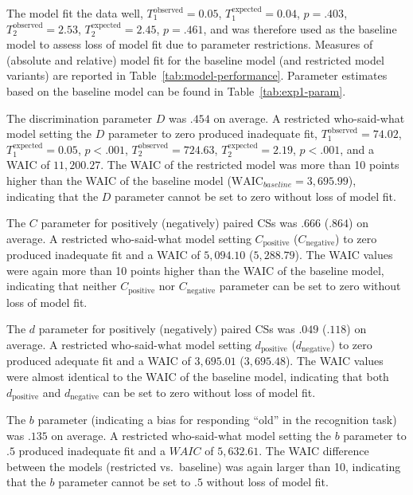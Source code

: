 \documentclass[
  man,floatsintext]{apa6}
\begin{document}
The model fit the data well, \(T_1^{\mathrm{observed}} = 0.05\), \(T_1^{\mathrm{expected}} = 0.04\), \(p = .403\), \(T_2^{\mathrm{observed}} = 2.53\), \(T_2^{\mathrm{expected}} = 2.45\), \(p = .461\), and was therefore used as the baseline model to assess loss of model fit due to parameter restrictions.
Measures of (absolute and relative) model fit for the baseline model (and restricted model variants) are reported in Table~\ref{tab:model-performance}.
Parameter estimates based on the baseline model can be found in Table~\ref{tab:exp1-param}.

The discrimination parameter \(D\) was \(.454\) on average.
A restricted who-said-what model setting the \(D\) parameter to zero produced inadequate fit, \(T_1^{\mathrm{observed}} = 74.02\), \(T_1^{\mathrm{expected}} = 0.05\), \(p < .001\), \(T_2^{\mathrm{observed}} = 724.63\), \(T_2^{\mathrm{expected}} = 2.19\), \(p < .001\), and a WAIC of \(11,200.27\).
The WAIC of the restricted model was more than 10 points higher than the WAIC of the baseline model (\(\text{WAIC}_{baseline}=3,695.99\)), indicating that the \(D\) parameter cannot be set to zero without loss of model fit.

The \(C\) parameter for positively (negatively) paired CSs was \(.666\) (\(.864\)) on average.
A restricted who-said-what model setting \(C_{\mathrm{positive}}\) (\(C_{\mathrm{negative}}\)) to zero produced inadequate fit and a WAIC of \(5,094.10\) (\(5,288.79\)).
The WAIC values were again more than 10 points higher than the WAIC of the baseline model, indicating that neither \(C_{\mathrm{positive}}\) nor \(C_{\mathrm{negative}}\) parameter can be set to zero without loss of model fit.

The \(d\) parameter for positively (negatively) paired CSs was \(.049\) (\(.118\)) on average.
A restricted who-said-what model setting \(d_{\mathrm{positive}}\) (\(d_{\mathrm{negative}}\)) to zero produced adequate fit and a WAIC of \(3,695.01\) (\(3,695.48\)).
The WAIC values were almost identical to the WAIC of the baseline model, indicating that both \(d_{\mathrm{positive}}\) and \(d_{\mathrm{negative}}\) can be set to zero without loss of model fit.

The \(b\) parameter (indicating a bias for responding ``old'' in the recognition task) was \(.135\) on average.
A restricted who-said-what model setting the \(b\) parameter to \(.5\) produced inadequate fit and a \(WAIC\) of \(5,632.61\).
The WAIC difference between the models (restricted vs.~baseline) was again larger than 10, indicating that the \(b\) parameter cannot be set to \(.5\) without loss of model fit.
\end{document}
